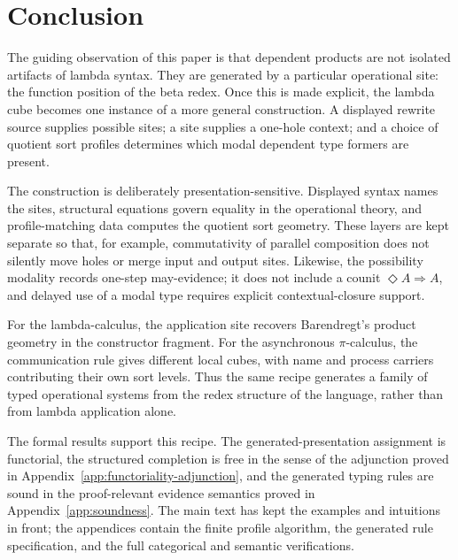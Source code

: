\documentclass[11pt]{article}
\newcommand{\Dia}{\Diamond}
\begin{document}
\section{Conclusion}

The guiding observation of this paper is that dependent products are not isolated artifacts of lambda syntax.  They are generated by a particular operational site: the function position of the beta redex.  Once this is made explicit, the lambda cube becomes one instance of a more general construction.  A displayed rewrite source supplies possible sites; a site supplies a one-hole context; and a choice of quotient sort profiles determines which modal dependent type formers are present.

The construction is deliberately presentation-sensitive.  Displayed syntax names the sites, structural equations govern equality in the operational theory, and profile-matching data computes the quotient sort geometry.  These layers are kept separate so that, for example, commutativity of parallel composition does not silently move holes or merge input and output sites.  Likewise, the possibility modality records one-step may-evidence; it does not include a counit \(\Dia A\Rightarrow A\), and delayed use of a modal type requires explicit contextual-closure support.

For the lambda-calculus, the application site recovers Barendregt's product geometry in the constructor fragment.  For the asynchronous \(\pi\)-calculus, the communication rule gives different local cubes, with name and process carriers contributing their own sort levels.  Thus the same recipe generates a family of typed operational systems from the redex structure of the language, rather than from lambda application alone.

The formal results support this recipe.  The generated-presentation assignment is functorial, the structured completion is free in the sense of the adjunction proved in Appendix~\ref{app:functoriality-adjunction}, and the generated typing rules are sound in the proof-relevant evidence semantics proved in Appendix~\ref{app:soundness}.  The main text has kept the examples and intuitions in front; the appendices contain the finite profile algorithm, the generated rule specification, and the full categorical and semantic verifications.

\clearpage
\appendix
\end{document}
